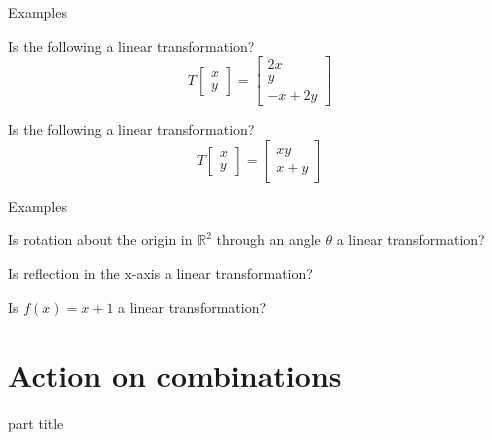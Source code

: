 \documentclass{beamer}
\begin{document}
\begin{frame}{Examples}
\begin{example}
Is the following a linear transformation?
\begin{equation*}
T \left[
\begin{array}{c}
x\\
y
\end{array}
\right] = \left[
\begin{array}{c}
2x\\
y\\
-x+2y
\end{array}
\right]
\end{equation*}
\end{example}
\begin{example}
Is the following a linear transformation?
\begin{equation*}
T \left[
\begin{array}{c}
x\\
y
\end{array}
\right] = \left[
\begin{array}{c}
xy\\
x+y
\end{array}
\right]
\end{equation*}
\end{example}
\end{frame}

\begin{frame}{Examples}
\begin{example}
Is rotation about the origin in $\mathbb{R}^2$ through an angle $\theta$ a linear transformation?
\end{example}
\begin{example}
Is reflection in the x-axis a linear transformation?
\end{example}
\begin{example}
Is $f(x) = x+1$ a linear transformation?
\end{example}
\end{frame}

\section{Action on combinations}

\begin{frame}
\begin{beamercolorbox}[sep=12pt,center]{part title}
\insertsection\par
\end{beamercolorbox}
\end{frame}
\end{document}
